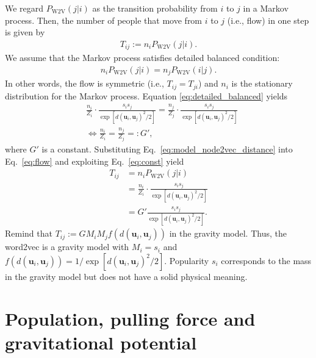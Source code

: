 \documentclass[12pt]{article} %
\def\vec#1{{\bm #1}}
\begin{document}
We regard $P_{\text{W2V}}(j \vert i)$ as the transition probability from $i$ to $j$ in a Markov process.
Then, the number of people that move from $i$ to $j$ (i.e., flow) in one step is given by 
\begin{align}
    \label{eq:flow}
    T_{ij}:= n_i P_{\text{W2V}}(j \vert i).
\end{align}
We assume that the Markov process satisfies detailed balanced condition:  
\begin{align}
    \label{eq:detailed_balanced}
    n_i P_{\text{W2V}}\left(j \vert i \right) = n_j P_{\text{W2V}}\left(i \vert j \right).
\end{align}
In other words, the flow is symmetric (i.e., $T_{ij} = T_{ji}$) and $n_i$ is the stationary distribution for the Markov process.
Equation \eqref{eq:detailed_balanced} yields 
\begin{align}
    &\frac{n_i}{Z_i}\cdot \frac{s_i s_j}{\exp\left[d\left(\vec{u}_i, \vec{u}_j\right)^2 / 2\right]} = \frac{n_j}{Z_j}\cdot \frac{s_i s_j}{\exp\left[d\left(\vec{u}_i, \vec{u}_j\right)^2 / 2 \right]} \\
    &\iff \frac{n_i}{Z_i} = \frac{n_j}{Z_j} =: G', \label{eq:const}
\end{align}
where $G'$ is a constant. 
Substituting Eq.~\eqref{eq:model_node2vec_distance} into Eq.~\eqref{eq:flow} and exploiting Eq.~\eqref{eq:const} yield 
\begin{align}
    \label{eq:flow_gravity_model}
    T_{ij} &= n_i P_{\text{W2V}}\left(j \vert i \right)\nonumber \\
           &= \frac{n_i}{Z_i} \cdot \frac{s_i s_j}{\exp\left[d\left(\vec{u}_i, \vec{u}_j\right)^2 / 2 \right]}\nonumber \\ 
           &= G' \frac{s_i s_j}{\exp\left[d\left(\vec{u}_i, \vec{u}_j\right)^2 / 2 \right]}. 
\end{align}
Remind that $T_{ij}:= G M_i M_j f\left(d\left(\vec{u}_i,\vec{u}_j\right)\right)$ in the gravity model.
Thus, the word2vec is a gravity model with $M_i=s_i$ and $f\left(d\left(\vec{u}_i,\vec{u}_j\right)\right) = 1/\exp\left[d\left(\vec{u}_i,\vec{u}_j\right) ^ 2 /2\right]$.
Popularity $s_i$ corresponds to the mass in the gravity model but does not have a solid physical meaning.

\section{Population, pulling force and gravitational potential}
\end{document}
